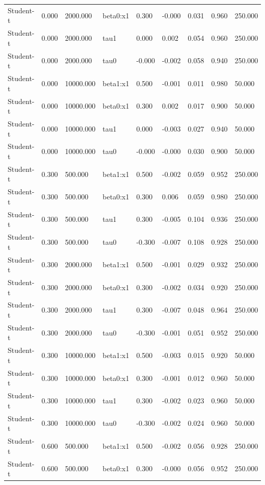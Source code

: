 \begin{table}[htbp]
\begin{tabular}{lllllllll}
Student-t & 0.000 & 2000.000 & beta0:x1 & 0.300 & -0.000 & 0.031 & 0.960 & 250.000 \\
Student-t & 0.000 & 2000.000 & tau1 & 0.000 & 0.002 & 0.054 & 0.960 & 250.000 \\
Student-t & 0.000 & 2000.000 & tau0 & -0.000 & -0.002 & 0.058 & 0.940 & 250.000 \\
Student-t & 0.000 & 10000.000 & beta1:x1 & 0.500 & -0.001 & 0.011 & 0.980 & 50.000 \\
Student-t & 0.000 & 10000.000 & beta0:x1 & 0.300 & 0.002 & 0.017 & 0.900 & 50.000 \\
Student-t & 0.000 & 10000.000 & tau1 & 0.000 & -0.003 & 0.027 & 0.940 & 50.000 \\
Student-t & 0.000 & 10000.000 & tau0 & -0.000 & -0.000 & 0.030 & 0.900 & 50.000 \\
Student-t & 0.300 & 500.000 & beta1:x1 & 0.500 & -0.002 & 0.059 & 0.952 & 250.000 \\
Student-t & 0.300 & 500.000 & beta0:x1 & 0.300 & 0.006 & 0.059 & 0.980 & 250.000 \\
Student-t & 0.300 & 500.000 & tau1 & 0.300 & -0.005 & 0.104 & 0.936 & 250.000 \\
Student-t & 0.300 & 500.000 & tau0 & -0.300 & -0.007 & 0.108 & 0.928 & 250.000 \\
Student-t & 0.300 & 2000.000 & beta1:x1 & 0.500 & -0.001 & 0.029 & 0.932 & 250.000 \\
Student-t & 0.300 & 2000.000 & beta0:x1 & 0.300 & -0.002 & 0.034 & 0.920 & 250.000 \\
Student-t & 0.300 & 2000.000 & tau1 & 0.300 & -0.007 & 0.048 & 0.964 & 250.000 \\
Student-t & 0.300 & 2000.000 & tau0 & -0.300 & -0.001 & 0.051 & 0.952 & 250.000 \\
Student-t & 0.300 & 10000.000 & beta1:x1 & 0.500 & -0.003 & 0.015 & 0.920 & 50.000 \\
Student-t & 0.300 & 10000.000 & beta0:x1 & 0.300 & -0.001 & 0.012 & 0.960 & 50.000 \\
Student-t & 0.300 & 10000.000 & tau1 & 0.300 & -0.002 & 0.023 & 0.960 & 50.000 \\
Student-t & 0.300 & 10000.000 & tau0 & -0.300 & -0.002 & 0.024 & 0.960 & 50.000 \\
Student-t & 0.600 & 500.000 & beta1:x1 & 0.500 & -0.002 & 0.056 & 0.928 & 250.000 \\
Student-t & 0.600 & 500.000 & beta0:x1 & 0.300 & -0.000 & 0.056 & 0.952 & 250.000 \\

\end{tabular}
\end{table}
